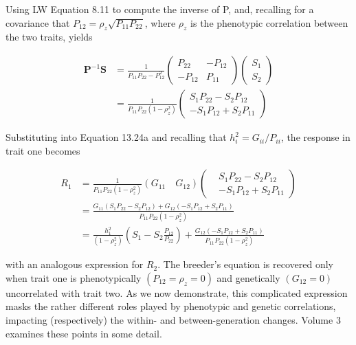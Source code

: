 \documentclass{article}
\begin{document}
Using LW Equation 8.11 to compute the inverse of P, and, recalling for a covariance that  $ P_{12} = \rho_{z} \sqrt{P_{11} P_{22}} $, where  $ \rho_{z} $ is the phenotypic correlation between the two traits, yields

\begin{equation}
\begin{aligned}\mathbf{P}^{-1}\mathbf{S}&=\frac{1}{P_{11}P_{22}-P_{12}^{2}}\begin{pmatrix}P_{22}&-P_{12}\\ -P_{12}&P_{11}\end{pmatrix}\begin{pmatrix}S_{1}\\ S_{2}\end{pmatrix}\\&=\frac{1}{P_{11}P_{22}(1-\rho_{z}^{2})}\begin{pmatrix}S_{1}P_{22}-S_{2}P_{12}\\ -S_{1}P_{12}+S_{2}P_{11}\end{pmatrix}\end{aligned}
\tag{13.24b}
\label{eq:13_24b}
\end{equation}

Substituting into Equation 13.24a and recalling that  $ h_{i}^{2} = G_{ii} / P_{ii} $, the response in trait one becomes

\begin{equation}
\begin{aligned}R_{1}&=\frac{1}{P_{11}P_{22}(1-\rho_{z}^{2})}\left(G_{11}\quad G_{12}\right)\left(\begin{aligned}&S_{1}P_{22}-S_{2}P_{12}\\&-S_{1}P_{12}+S_{2}P_{11}\end{aligned}\right)\\&=\frac{G_{11}\left(S_{1}P_{22}-S_{2}P_{12}\right)+G_{12}\left(-S_{1}P_{12}+S_{2}P_{11}\right)}{P_{11}P_{22}(1-\rho_{z}^{2})}\\&=\frac{h_{1}^{2}}{\left(1-\rho_{z}^{2}\right)}\left(S_{1}-S_{2}\frac{P_{12}}{P_{22}}\right)+\frac{G_{12}\left(-S_{1}P_{12}+S_{2}P_{11}\right)}{P_{11}P_{22}(1-\rho_{z}^{2})}\end{aligned}
\tag{13.24c}
\label{eq:13_24c}
\end{equation}

with an analogous expression for  $ R_{2} $. The breeder's equation is recovered only when trait one is phenotypically  $ (P_{12} = \rho_{z} = 0) $ and genetically  $ (G_{12} = 0) $ uncorrelated with trait two. As we now demonstrate, this complicated expression masks the rather different roles played by phenotypic and genetic correlations, impacting (respectively) the within- and between-generation changes. Volume 3 examines these points in some detail.
\end{document}
